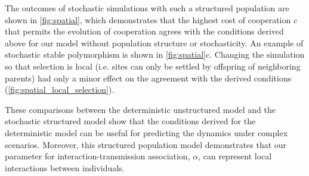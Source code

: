 \documentclass[12pt]{extarticle}
\begin{document}
The outcomes of stochastic simulations with such a structured population are shown in \autoref{fig:spatial}, which demonstrates that the highest cost of cooperation $c$ that permits the evolution of cooperation agrees with the conditions derived above for our model without population structure or stochasticity.
An example of stochastic stable polymorphism is shown in \autoref{fig:spatial}c.
Changing the simulation so that selection is local (i.e. sites can only be settled by offspring of neighboring parents) had only a minor effect on the agreement with the derived conditions (\autoref{fig:spatial_local_selection}).

These comparisons between the deterministic unstructured model and the stochastic structured model show that the conditions derived for the deterministic model can be useful for predicting the dynamics under complex scenarios. 
Moreover, this structured population model demonstrates that our parameter for interaction-transmission association, $\alpha$, can represent local interactions between individuals.

\newpage
\end{document}
